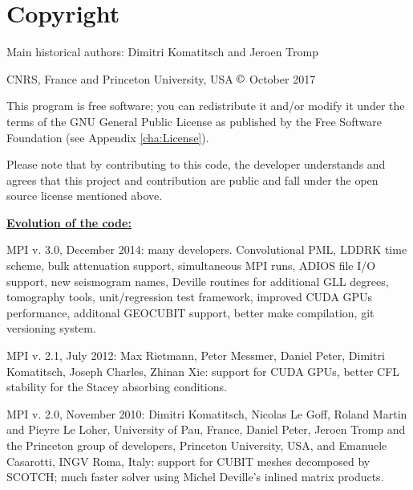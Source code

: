 
\chapter*{Copyright}

Main historical authors: Dimitri Komatitsch and Jeroen Tromp

CNRS, France and Princeton University, USA\newline
$\copyright$ October 2017\newline

\noindent
This program is free software; you can redistribute it and/or modify
it under the terms of the GNU General Public License as published
by the Free Software Foundation (see Appendix \ref{cha:License}).\newline

\noindent
Please note that by contributing to this code, the developer understands and agrees that this project and contribution
are public and fall under the open source license mentioned above.\newline

\noindent
\textbf{\underline{Evolution of the code:}}\newline

MPI v. 3.0, December 2014: many developers.
Convolutional PML, LDDRK time scheme, bulk attenuation support, simultaneous MPI runs,
ADIOS file I/O support, new seismogram names,
Deville routines for additional GLL degrees, tomography tools, unit/regression test framework,
improved CUDA GPUs performance, additonal GEOCUBIT support, better make compilation,
git versioning system. \newline


MPI v. 2.1, July 2012: Max Rietmann, Peter Messmer, Daniel Peter, Dimitri
Komatitsch, Joseph Charles, Zhinan Xie: support for CUDA GPUs, better
CFL stability for the Stacey absorbing conditions. \newline


MPI v. 2.0, November 2010: Dimitri Komatitsch, Nicolas Le Goff, Roland
Martin and Pieyre Le Loher, University of Pau, France, Daniel Peter,
Jeroen Tromp and the Princeton group of developers, Princeton University,
USA, and Emanuele Casarotti, INGV Roma, Italy: support for CUBIT meshes
decomposed by SCOTCH; much faster solver using Michel Deville's inlined
matrix products.\newline


